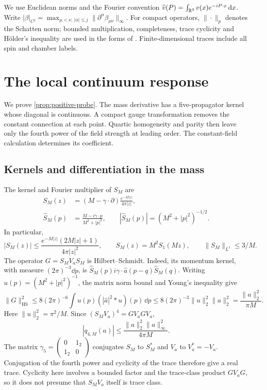 We use Euclidean norms and the Fourier convention
$\widehat v(P)=\int_{\mathbb R^3}v(x)e^{-iP\cdot x}\,\mathrm d x$.
Write
$|\beta|_{C^j}=\max_{\mu<\nu,\,|\alpha|\le j}
\|\partial^\alpha\beta_{\mu\nu}\|_\infty$.
For compact operators, $\|\cdot\|_p$ denotes the Schatten norm;
bounded multiplication, completeness, trace cyclicity and
H\"older's inequality are used in the forms of
\cite[slides~16, 53--56]{PongeSchatten2025}.
Finite-dimensional traces include all spin and chamber labels.
\section{The local continuum response}\label{sec:positive-probe}

We prove \cref{prop:positive-probe}. The mass derivative has a
five-propagator kernel whose diagonal is continuous. A compact gauge
transformation removes the constant connection at each point.
Quartic homogeneity and parity then leave only the fourth power of
the field strength at leading order. The constant-field calculation
determines its coefficient.

\subsection{Kernels and differentiation in the mass}

The kernel and Fourier multiplier of $S_M$ are
\begin{align}
 S_M(z)&=(M-\gamma\cdot\partial)
              \frac{e^{-M|z|}}{4\pi|z|},\label{eq:probe-free-kernel}\\
 \widehat S_M(p)&=\frac{M-i\gamma\cdot p}{M^2+|p|^2},\qquad
 |\widehat S_M(p)|=(M^2+|p|^2)^{-1/2}.
 \label{eq:probe-free-symbol}
\end{align}
In particular,
\[
 |S_M(z)|\le\frac{e^{-M|z|}(2M|z|+1)}{4\pi|z|^2},\qquad
 S_M(z)=M^2S_1(Mz),\qquad \|S_M\|_{L^1}\le3/M.
\]
The operator $G=S_MV_aS_M$ is Hilbert--Schmidt. Indeed, its momentum
kernel, with measure $(2\pi)^{-3}\dd p$, is
$\widehat S_M(p)i\gamma\cdot\widehat a(p-q)\widehat S_M(q)$.
Writing $u(p)=(M^2+|p|^2)^{-1}$, the matrix norm bound and Young's
inequality give
\[
 \|G\|_{\mathrm{HS}}^2
 \le8(2\pi)^{-6}\int u(p)(|\widehat a|^2*u)(p)\,\dd p
 \le8(2\pi)^{-3}\|u\|_2^2\|a\|_2^2
 =\frac{\|a\|_2^2}{\pi M}.
\]
Here $\|u\|_2^2=\pi^2/M$. Since $(S_MV_a)^4=GV_aGV_a$,
\begin{equation}\label{eq:probe-trace-bound}
 |q_{4,M}(a)|\le\frac{\|a\|_2^2\|a\|_\infty^2}{4\pi M}.
\end{equation}
The matrix $\gamma_5=\left(\begin{smallmatrix}0&1_2\\1_2&0\end{smallmatrix}\right)$
conjugates $S_M$ to $S_M^*$ and $V_a$ to $V_a^*=-V_a$.
Conjugation of the fourth power and cyclicity of the trace therefore
give a real trace. Cyclicity here involves a bounded factor and the
trace-class product $GV_aG$, so it does not presume that $S_MV_a$
itself is trace class.

